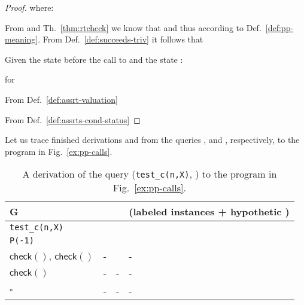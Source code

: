 \documentclass{llncs}
\newcommand{\kbd}[1]{\mbox{\tt #1}}
\newcommand{\emptyGoal}{\ensuremath{\square}}
\newcommand{\checkLitLab}[1]{\ensuremath{\textsf{check}(#1)}}
\begin{document}
\begin{proof}
  where: 
   
   From  and
  Th.~\ref{thm:rtcheck} we know that 
  and thus  according to
  Def.~\ref{def:pp-meaning}.
\newline
   From Def.~\ref{def:succeeds-triv} it follows that 
  
\newline
   Given the state  before the call to  and the
  state : 
   
   
   for
  
\newline
   From Def.~\ref{def:assrt-valuation}
  
 From Def.~\ref{def:assrts-cond-status} 
  \hfill 

\end{proof}

Let us trace finished derivations  and  from the queries
, 
and , respectively, to the
program in Fig.~\ref{ex:pp-calls}.

\begin{table}[h]
  \caption{A derivation of the query (\kbd{test\_c(n,X)}, ) to
    the program in Fig.~\ref{ex:pp-calls}.}
  \begin{minipage}{\textwidth}
  \small
    \begin{tabular}{p{}|p{}p{}p{}}
      \hline
      G         
          &   
          &  
          & (labeled instances + hypothetic )
      \\ \hline
      {\tt test\_c(n,X)} 
          & \newline
            \newline
                
          & \newline
            
          & \newline
            \newline
             
      \\ \hline
      {\tt P(-1)}
          &          
          & \newline
            
          & \newline
             
      \\ \hline
      \checkLitLab{},\newline
      \checkLitLab{}         
          & -         
          & 
          & -
      \\ \hline
      \checkLitLab{} 
          & -          
          & -
          & -
      \\ \hline
      \emptyGoal
          & -
          & -
          & -
      \\ \hline
    \end{tabular}
  \ \\
  \end{minipage}
  \label{tbl:test1}
\end{table}
\end{document}
